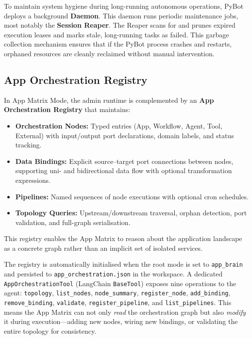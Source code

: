 \documentclass[11pt,a4paper]{article}
\begin{document}
To maintain system hygiene during long-running autonomous operations, PyBot deploys a background \textbf{Daemon}.
This daemon runs periodic maintenance jobs, most notably the \textbf{Session Reaper}.
The Reaper scans for and prunes expired execution leases and marks stale, long-running tasks as failed. This garbage collection mechanism ensures that if the PyBot process crashes and restarts, orphaned resources are cleanly reclaimed without manual intervention.

\subsection{App Orchestration Registry}

In App Matrix Mode, the admin runtime is complemented by an \textbf{App Orchestration Registry} that maintains:

\begin{itemize}
  \item \textbf{Orchestration Nodes:} Typed entries (App, Workflow, Agent, Tool, External) with input/output port declarations, domain labels, and status tracking.
  \item \textbf{Data Bindings:} Explicit source--target port connections between nodes, supporting uni- and bidirectional data flow with optional transformation expressions.
  \item \textbf{Pipelines:} Named sequences of node executions with optional cron schedules.
  \item \textbf{Topology Queries:} Upstream/downstream traversal, orphan detection, port validation, and full-graph serialisation.
\end{itemize}

This registry enables the App Matrix to reason about the application landscape as a concrete graph rather than an implicit set of isolated services.

The registry is automatically initialised when the root mode is set to \texttt{app\_brain} and persisted to \texttt{app\_orchestration.json} in the workspace.
A dedicated \texttt{AppOrchestrationTool} (LangChain \texttt{BaseTool}) exposes nine operations to the agent: \texttt{topology}, \texttt{list\_nodes}, \texttt{node\_summary}, \texttt{register\_node}, \texttt{add\_binding}, \texttt{remove\_binding}, \texttt{validate}, \texttt{register\_pipeline}, and \texttt{list\_pipelines}.
This means the App Matrix can not only \emph{read} the orchestration graph but also \emph{modify} it during execution---adding new nodes, wiring new bindings, or validating the entire topology for consistency.
\end{document}
